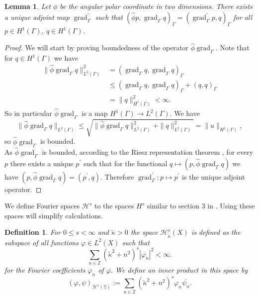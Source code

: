 \documentclass[12pt,journal,compsoc, onecolumn]{IEEEtran}
\newtheorem{lemma}[theorem]{Lemma}
\newtheorem{definition}[theorem]{Definition}
\begin{document}
\begin{lemma}
\label{lem:b_simplify}
    Let $\phi$ be the angular polar coordinate in two dimensions.
    There exists a unique adjoint map $\operatorname{grad}_{\Gamma}^\prime$ such that 
    $\left( \hat{\phi} p, \operatorname{grad}_{\Gamma} q\right)_{\Gamma} = 
    \left( \operatorname{grad}^\prime_{\Gamma} p, q\right)_{\Gamma}$ 
    for all $p \in H^1(\Gamma)$, $q \in H^1(\Gamma)$.
\end{lemma}
\begin{proof}
We will start by proving boundedness of the  operator $\hat{\phi}\operatorname{grad}_{\Gamma}$.
Note that for $q \in H^1(\Gamma)$ we have 
\begin{align} 
    \|\hat{\phi}\operatorname{grad}_{\Gamma}q\|_{L^2(\Gamma)}^2 &= (\operatorname{grad}_{\Gamma}q,  \operatorname{grad}_{\Gamma}q)_{\Gamma} \nonumber \\ 
    &\leq (\operatorname{grad}_{\Gamma}q,  \operatorname{grad}_{\Gamma}q)_{\Gamma} + (q,  q)_{\Gamma} \nonumber \\ 
    &= \|q\|_{H^1(\Gamma)}^2 < \infty \nonumber.
\end{align}
So in particular $\hat{\phi}\operatorname{grad}_{\Gamma}$ is a map $H^1(\Gamma) \rightarrow L^2(\Gamma)$. We have $$\|\hat{\phi}\operatorname{grad}_{\Gamma}q\|_{L^2(\Gamma)} \leq \sqrt{\|\hat{\phi}\operatorname{grad}_{\Gamma}q\|_{L^2(\Gamma)}^2 + \|q\|_{L^2(\Gamma)}^2} = \|u\|_{H^1(\Gamma)},$$ so $\hat{\phi} \operatorname{grad}_{\Gamma}$ is bounded. \\
As $\hat{\phi}\operatorname{grad}_{\Gamma}$ is bounded, according to the Riesz representation theorem \cite{rudin2008function}, for every $p$ there exists a unique $p^\prime$ such that for the functional $q \mapsto (p, \hat{\phi}\operatorname{grad}_{\Gamma}q)$ we have $(p, \hat{\phi}\operatorname{grad}_{\Gamma}q) = (p^\prime, q)$. Therefore $\operatorname{grad}_{\Gamma}^\prime: p \mapsto p^\prime$ is the unique adjoint operator. 
\end{proof}  \noindent
We define Fourier spaces  $\mathcal{H}^s$ to the spaces ${H}^s$ similar to section 3 in \cite{amini1998preconditioned}. Using these spaces will simplify calculations.
\begin{definition} 
    \label{def:fouier_sobolev}
    For \(0 \leq s<\infty\) and $\tilde \kappa> 0$ the space \(\mathcal{H}^{s}_{\tilde \kappa}(X)\) is defined as the subspace of all functions $\varphi \in L^{2}(X)$
    such that
    $$
    \sum\limits_{n \in \mathbb{Z}}\left(\tilde \kappa^2+n^{2}\right)^{s}\left|\varphi_{n}\right|^{2}<\infty. 
    $$
    for the Fourier coefficients \(\varphi_{n}\) of \(\varphi\). We define an inner product in this space by
    $$
    (\varphi, \psi)_{\mathcal{H}^{s}(\mathbb{S})}:=\sum_{n \in \mathbb{Z}}\left(\tilde \kappa^2+n^{2}\right)^{s} \varphi_{n} \overline{\psi_{n}}.
    $$
\end{definition}  \noindent
\end{document}

